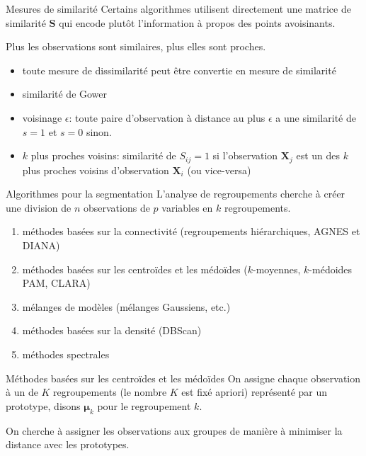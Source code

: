 \documentclass[
  ignorenonframetext,
]{beamer}
\providecommand{\tightlist}{%
  \setlength{\itemsep}{0pt}\setlength{\parskip}{0pt}}\usepackage{longtable,booktabs,array}
\begin{document}
\begin{frame}{Mesures de similarité}
\protect\hypertarget{mesures-de-similarituxe9}{}
Certains algorithmes utilisent directement une matrice de similarité
\(\mathbf{S}\) qui encode plutôt l'information à propos des points
avoisinants.

Plus les observations sont similaires, plus elles sont proches.

\begin{itemize}
\tightlist
\item
  toute mesure de dissimilarité peut être convertie en mesure de
  similarité
\item
  similarité de Gower
\item
  voisinage \(\epsilon\): toute paire d'observation à distance au plus
  \(\epsilon\) a une similarité de \(s=1\) et \(s=0\) sinon.
\item
  \(k\) plus proches voisins: similarité de \(S_{ij}=1\) si
  l'observation \(\mathbf{X}_j\) est un des \(k\) plus proches voisins
  d'observation \(\mathbf{X}_i\) (ou vice-versa)
\end{itemize}
\end{frame}

\begin{frame}{Algorithmes pour la segmentation}
\protect\hypertarget{algorithmes-pour-la-segmentation}{}
L'analyse de regroupements cherche à créer une division de \(n\)
observations de \(p\) variables en \(k\) regroupements.

\begin{enumerate}
\tightlist
\item
  méthodes basées sur la connectivité (regroupements hiérarchiques,
  AGNES et DIANA)
\item
  méthodes basées sur les centroïdes et les médoïdes (\(k\)-moyennes,
  \(k\)-médoides PAM, CLARA)
\item
  mélanges de modèles (mélanges Gaussiens, etc.)
\item
  méthodes basées sur la densité (DBScan)
\item
  méthodes spectrales
\end{enumerate}
\end{frame}

\begin{frame}{Méthodes basées sur les centroïdes et les médoïdes}
\protect\hypertarget{muxe9thodes-basuxe9es-sur-les-centrouxefdes-et-les-muxe9douxefdes}{}
On assigne chaque observation à un de \(K\) regroupements (le nombre
\(K\) est fixé apriori) représenté par un prototype, disons
\(\boldsymbol{\mu}_k\) pour le regroupement \(k\).

On cherche à assigner les observations aux groupes de manière à
minimiser la distance avec les prototypes.
\end{frame}
\end{document}
